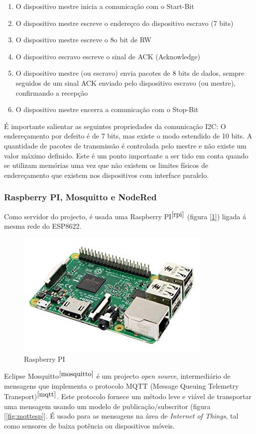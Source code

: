 \documentclass[12pt]{article}
\begin{document}
\begin{enumerate}
    \item O dispositivo mestre inicia a comunicação com o Start-Bit
    \item O dispositivo mestre escreve o endereçco do dispositivo escravo (7 bits)
    \item O dispositivo mestre escreve o 8o bit de RW
    \item O dispositivo escravo escreve o sinal de ACK (Acknowledge)
    \item O dispositivo mestre (ou escravo) envia pacotes de 8 bits de dados, sempre seguidos
de um sinal ACK enviado pelo dispositivo escravo (ou mestre), confirmando a recepção
    \item O dispositivo mestre encerra a comunicação com o Stop-Bit
\end{enumerate}


É importante salientar as seguintes propriedades da comunicação I2C:
 O endereçamento por defeito é de 7 bits, mas existe o modo estendido de 10
bits.
 A quantidade de pacotes de transmissão é controlada pelo mestre e não existe
um valor máximo definido. Este é um ponto importante a ser tido em conta
quando se utilizam memórias uma vez que não existem os limites físicos de
endereçamento que existem nos dispositivos com interface paralelo.


\subsubsection{Raspberry PI, Mosquitto e NodeRed}

Como servidor do projecto, é usada uma Raspberry PI$^{\cite{rpi}}$ (figura [\ref{fig:rpi}]) ligada á mesma rede do ESP8622.\\

\begin{figure}[H]
        \centering
        \includegraphics[width=0.4\linewidth]{imgs/raspberry.jpg}
        \caption{Raspberry PI}
        \label{fig:rpi}
\end{figure}

Eclipse Mosquitto$^{\cite{mosquitto}}$ é um projecto \textit{open source}, intermediário de mensagens que implementa o protocolo MQTT (Message Queuing Telemetry Transport)$^{\cite{mqtt}}$. Este protocolo fornece um método leve e viável de transportar uma mensagem usando um modelo de publicação/subscritor (figura [\ref{fig:mqttesp}]. É usado para as mensagens na área de \textit{Internet of Things}, tal como sensores de baixa potência ou dispositivos móveis.
\end{document}
